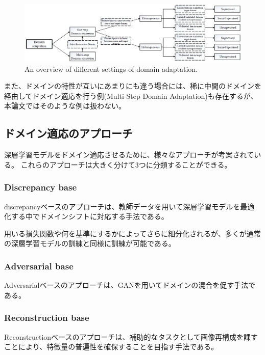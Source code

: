     \begin{figure}[ht]
      \centering
      \includegraphics[width=\linewidth]{2_related_works/img/category_of_DA.png}
      \caption{An overview of different settings of domain adaptation\cite{wang2018deep}.}
      \label{category_of_DA}
    \end{figure}

    また、ドメインの特性が互いにあまりにも違う場合には、稀に中間のドメインを経由してドメイン適応を行う例(Multi-Step Domain Adaptation)も存在するが、本論文ではそのような例は扱わない。
    

\subsection{ドメイン適応のアプローチ}
    深層学習モデルをドメイン適応させるために、様々なアプローチが考案されている。
    これらのアプローチは大きく分けて3つに分類することができる\cite{csurka2017domain}。
    \subsubsection{Discrepancy base}
        discrepancyベースのアプローチは、教師データを用いて深層学習モデルを最適化する中でドメインシフトに対応する手法である。
        
        用いる損失関数や何を基準にするかによってさらに細分化されるが、多くが通常の深層学習モデルの訓練と同様に訓練が可能である。
        
        
        
        
    \subsubsection{Adversarial base}
        Adversarialベースのアプローチは、GANを用いてドメインの混合を促す手法である。
    \subsubsection{Reconstruction base}
        Reconstructionベースのアプローチは、補助的なタスクとして画像再構成を課すことにより、特徴量の普遍性を確保することを目指す手法である。
    
